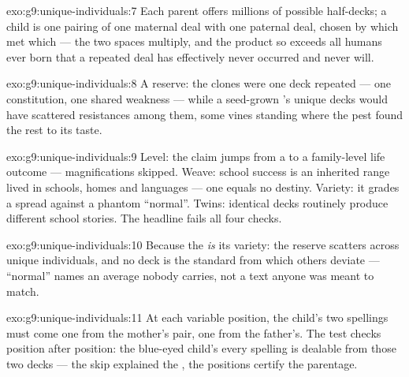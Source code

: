 \begin{solution}{exo:g9:unique-individuals:7}
Each parent offers millions of possible half-decks; a child
is one pairing of one maternal deal with one paternal deal,
chosen by which  met which --- the two spaces
multiply, and the product so exceeds all humans ever born
that a repeated deal has effectively never occurred and
never will.
\end{solution}

\begin{solution}{exo:g9:unique-individuals:8}
A reserve: the clones were one deck repeated --- one
constitution, one shared weakness --- while a seed-grown
's unique decks would have scattered resistances
among them, some vines standing where the pest found the
rest to its taste.
\end{solution}

\begin{solution}{exo:g9:unique-individuals:9}
Level: the claim jumps from a  to a family-level life
outcome --- magnifications skipped. Weave: school success
is an inherited range lived in schools, homes and
languages --- one  equals no destiny. Variety: it
grades a spread against a phantom ``normal''. Twins:
identical decks routinely produce different school
stories. The headline fails all four checks.
\end{solution}

\begin{solution}{exo:g9:unique-individuals:10}
Because the  \emph{is} its variety: the reserve
scatters  across unique individuals, and no deck is
the standard from which others deviate --- ``normal'' names
an average nobody carries, not a text anyone was meant to
match.
\end{solution}

\begin{solution}{exo:g9:unique-individuals:11}
At each variable position, the child's two spellings must
come one from the mother's pair, one from the father's. The
test checks position after position: the blue-eyed child's
every spelling is dealable from those two decks --- the
skip explained the , the positions certify the
parentage.
\end{solution}

